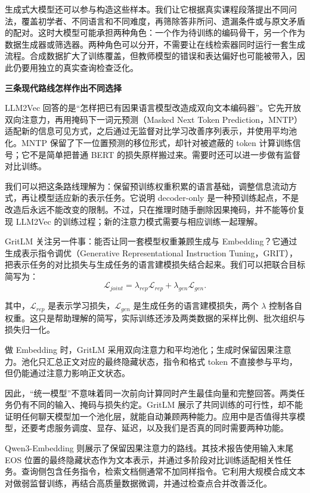 生成式大模型还可以参与构造这些样本。我们让它根据真实课程段落提出不同问法，覆盖初学者、不同语言和不同难度，再筛除答非所问、遗漏条件或与原文矛盾的配对。这时大模型可能承担两种角色：一个作为待训练的编码骨干，另一个作为数据生成器或筛选器。两种角色可以分开，不需要让在线检索器同时运行一套生成流程。合成数据扩大了训练覆盖，但教师模型的错误和表达偏好也可能被带入，因此仍要用独立的真实查询检查泛化。

\textbf{三条现代路线怎样作出不同选择}

LLM2Vec 回答的是``怎样把已有因果语言模型改造成双向文本编码器''。它先开放双向注意力，再用掩码下一词元预测（Masked Next Token Prediction，MNTP）适配新的信息可见方式，之后通过无监督对比学习改善序列表示，并使用平均池化。MNTP 保留了下一位置预测的移位形式，却针对被遮蔽的 token 计算训练信号；它不是简单把普通 BERT 的损失原样搬过来。需要时还可以进一步做有监督对比训练。

我们可以把这条路线理解为：保留预训练权重积累的语言基础，调整信息流动方式，再让模型适应新的表示任务。它说明 decoder-only 是一种预训练起点，不是改造后永远不能改变的限制。不过，只在推理时随手删除因果掩码，并不能等价复现 LLM2Vec 的训练过程；新的注意力模式需要与相应训练一起理解。

GritLM 关注另一件事：能否让同一套模型权重兼顾生成与 Embedding？它通过生成表示指令调优（Generative Representational Instruction Tuning，GRIT），把表示任务的对比损失与生成任务的语言建模损失结合起来。我们可以把联合目标简写为：
\[\mathcal{L}_{joint} = \lambda_{rep}\mathcal{L}_{rep} + \lambda_{gen}\mathcal{L}_{gen}.\]

其中，\(\mathcal{L}_{rep}\) 是表示学习损失，\(\mathcal{L}_{gen}\) 是生成任务的语言建模损失，两个 \(\lambda\) 控制各自权重。这只是帮助理解的简写，实际训练还涉及两类数据的采样比例、批次组织与损失归一化。

做 Embedding 时，GritLM 采用双向注意力和平均池化；生成时保留因果注意力。池化只汇总正文对应的最终隐藏状态，指令和格式 token 不直接参与平均，但仍能通过注意力影响正文状态。

因此，``统一模型''不意味着同一次前向计算同时产生最佳向量和完整回答。两类任务仍有不同的输入、掩码与损失约定。GritLM 展示了共同训练的可行性，却不能证明任何聊天模型加一个池化层，就能自动兼顾两种能力。应用中是否值得共享模型，还要考虑服务调度、显存、延迟，以及我们是否真的同时需要两种功能。

Qwen3-Embedding 则展示了保留因果注意力的路线。其技术报告使用输入末尾 EOS 位置的最终隐藏状态作为文本表示，并通过多阶段对比训练适配相关性任务。查询侧包含任务指令，检索文档侧通常不加同样指令。它利用大规模合成文本对做弱监督训练，再结合高质量数据微调，并通过检查点合并改善泛化。

